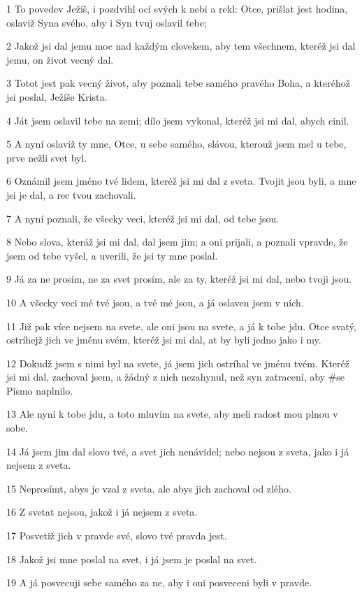 \par 1 To povedev Ježíš, i pozdvihl ocí svých k nebi a rekl: Otce, prišlat jest hodina, oslaviž Syna svého, aby i Syn tvuj oslavil tebe;
\par 2 Jakož jsi dal jemu moc nad každým clovekem, aby tem všechnem, kteréž jsi dal jemu, on život vecný dal.
\par 3 Totot jest pak vecný život, aby poznali tebe samého pravého Boha, a kteréhož jsi poslal, Ježíše Krista.
\par 4 Ját jsem oslavil tebe na zemi; dílo jsem vykonal, kteréž jsi mi dal, abych cinil.
\par 5 A nyní oslaviž ty mne, Otce, u sebe samého, slávou, kterouž jsem mel u tebe, prve nežli svet byl.
\par 6 Oznámil jsem jméno tvé lidem, kteréž jsi mi dal z sveta. Tvojit jsou byli, a mne jsi je dal, a rec tvou zachovali.
\par 7 A nyní poznali, že všecky veci, kteréž jsi mi dal, od tebe jsou.
\par 8 Nebo slova, kteráž jsi mi dal, dal jsem jim; a oni prijali, a poznali vpravde, že jsem od tebe vyšel, a uverili, že jsi ty mne poslal.
\par 9 Já za ne prosím, ne za svet prosím, ale za ty, kteréž jsi mi dal, nebo tvoji jsou.
\par 10 A všecky veci mé tvé jsou, a tvé mé jsou, a já oslaven jsem v nich.
\par 11 Již pak více nejsem na svete, ale oni jsou na svete, a já k tobe jdu. Otce svatý, ostríhejž jich ve jménu svém, kteréž jsi mi dal, at by byli jedno jako i my.
\par 12 Dokudž jsem s nimi byl na svete, já jsem jich ostríhal ve jménu tvém. Kteréž jsi mi dal, zachoval jsem, a žádný z nich nezahynul, než syn zatracení, aby #se Písmo naplnilo.
\par 13 Ale nyní k tobe jdu, a toto mluvím na svete, aby meli radost mou plnou v sobe.
\par 14 Já jsem jim dal slovo tvé, a svet jich nenávidel; nebo nejsou z sveta, jako i já nejsem z sveta.
\par 15 Neprosímt, abys je vzal z sveta, ale abys jich zachoval od zlého.
\par 16 Z svetat nejsou, jakož i já nejsem z sveta.
\par 17 Posvetiž jich v pravde své, slovo tvé pravda jest.
\par 18 Jakož jsi mne poslal na svet, i já jsem je poslal na svet.
\par 19 A já posvecuji sebe samého za ne, aby i oni posveceni byli v pravde.
